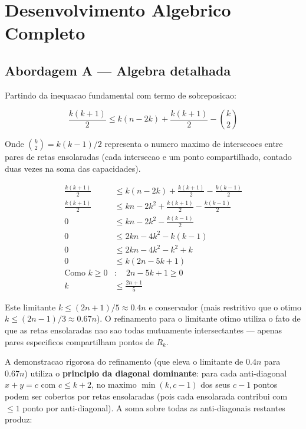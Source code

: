 \documentclass[5p]{elsarticle}
\theoremstyle{definition}
\begin{document}
\section{Desenvolvimento Algebrico Completo}\label{app:algebra}

\subsection{Abordagem A — Algebra detalhada}

Partindo da inequacao fundamental com termo de sobreposicao:

\[
\frac{k(k+1)}{2} \leq k(n - 2k) + \frac{k(k+1)}{2} - \binom{k}{2}
\]

Onde $\binom{k}{2} = k(k-1)/2$ representa o numero maximo de intersecoes entre
pares de retas ensolaradas (cada intersecao e um ponto compartilhado, contado
duas vezes na soma das capacidades).

\begin{align}
  \frac{k(k+1)}{2} &\leq k(n - 2k) + \frac{k(k+1)}{2} - \frac{k(k-1)}{2} \\
  \frac{k(k+1)}{2} &\leq kn - 2k^2 + \frac{k(k+1)}{2} - \frac{k(k-1)}{2} \\
  0 &\leq kn - 2k^2 - \frac{k(k-1)}{2} \\
  0 &\leq 2kn - 4k^2 - k(k-1) \\
  0 &\leq 2kn - 4k^2 - k^2 + k \\
  0 &\leq k(2n - 5k + 1) \\
  \text{Como } k \geq 0&: \quad 2n - 5k + 1 \geq 0 \\
  k &\leq \frac{2n+1}{5}
\end{align}

Este limitante $k \leq (2n+1)/5 \approx 0.4n$ e conservador (mais restritivo que o
otimo $k \leq (2n-1)/3 \approx 0.67n$). O refinamento para o limitante otimo utiliza
o fato de que as retas ensolaradas nao sao todas mutuamente intersectantes — apenas
pares especificos compartilham pontos de $R_k$.

A demonstracao rigorosa do refinamento (que eleva o limitante de $0.4n$ para $0.67n$)
utiliza o \textbf{principio da diagonal dominante}: para cada anti-diagonal
$x+y = c$ com $c \leq k+2$, no maximo $\min(k, c-1)$ dos seus $c-1$ pontos podem
ser cobertos por retas ensolaradas (pois cada ensolarada contribui com $\leq 1$ ponto
por anti-diagonal). A soma sobre todas as anti-diagonais restantes produz:
\end{document}
